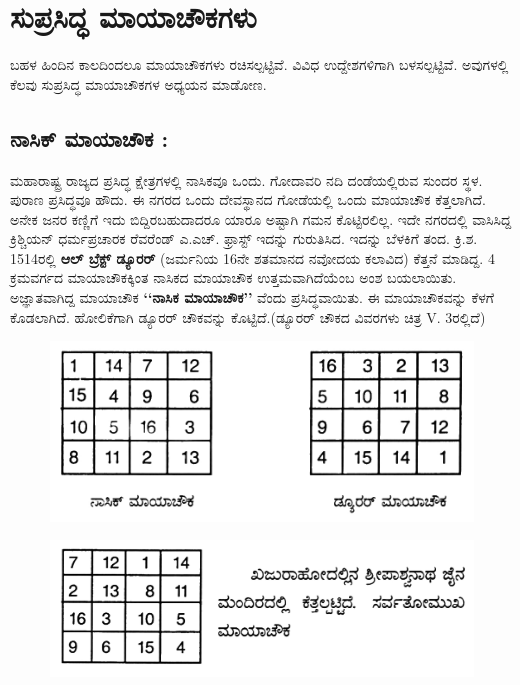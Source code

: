 \chapter{ಸುಪ್ರಸಿದ್ಧ ಮಾಯಾಚೌಕಗಳು}

ಬಹಳ ಹಿಂದಿನ ಕಾಲದಿಂದಲೂ ಮಾಯಾಚೌಕಗಳು ರಚಿಸಲ್ಪಟ್ಟಿವೆ. ವಿವಿಧ ಉದ್ದೇಶಗಳಿಗಾಗಿ ಬಳಸಲ್ಪಟ್ಟಿವೆ. ಅವುಗಳಲ್ಲಿ ಕೆಲವು ಸುಪ್ರಸಿದ್ಧ ಮಾಯಾಚೌಕಗಳ ಅಧ್ಯಯನ ಮಾಡೋಣ.

\section*{ನಾಸಿಕ್ ಮಾಯಾಚೌಕ :}

ಮಹಾರಾಷ್ಟ್ರ ರಾಜ್ಯದ ಪ್ರಸಿದ್ಧ ಕ್ಷೇತ್ರಗಳಲ್ಲಿ ನಾಸಿಕವೂ ಒಂದು. ಗೋದಾವರಿ ನದಿ ದಂಡೆ\-ಯಲ್ಲಿರುವ ಸುಂದರ ಸ್ಥಳ. ಪುರಾಣ ಪ್ರಸಿದ್ಧವೂ ಹೌದು. ಈ ನಗರದ ಒಂದು ದೇವಸ್ಥಾನದ ಗೋಡೆಯಲ್ಲಿ ಒಂದು ಮಾಯಾಚೌಕ ಕೆತ್ತಲಾಗಿದೆ. ಅನೇಕ ಜನರ ಕಣ್ಣಿಗೆ ಇದು ಬಿದ್ದಿರಬಹುದಾದರೂ ಯಾರೂ ಅಷ್ಟಾಗಿ ಗಮನ ಕೊಟ್ಟಿರಲಿಲ್ಲ. ಇದೇ ನಗರದಲ್ಲಿ ವಾಸಿಸಿದ್ದ ಕ್ರಿಶ್ಚಿಯನ್ ಧರ್ಮಪ್ರಚಾರಕ ರೆವರೆಂಡ್ ಎ.ಎಚ್. ಫ್ರಾಸ್ಟ್ ಇದನ್ನು ಗುರುತಿಸಿದ. ಇದನ್ನು ಬೆಳಕಿಗೆ ತಂದ. ಕ್ರಿ.ಶ. 1514ರಲ್ಲಿ \textbf{ಆಲ್ ಬ್ರೆಕ್ಟ್ ಡ್ಯೂರರ್} (ಜರ್ಮನಿಯ 16ನೇ ಶತಮಾನದ ನವೋದಯ ಕಲಾವಿದ) ಕೆತ್ತನೆ ಮಾಡಿದ್ದ. 4 ಕ್ರಮವರ್ಗದ ಮಾಯಾಚೌಕಕ್ಕಿಂತ ನಾಸಿಕದ ಮಾಯಾಚೌಕ ಉತ್ತಮವಾಗಿದೆಯೆಂಬ ಅಂಶ ಬಯಲಾಯಿತು. ಅಜ್ಞಾತವಾಗಿದ್ದ ಮಾಯಾಚೌಕ \textbf{‘‘ನಾಸಿಕ ಮಾಯಾಚೌಕ’’} ವೆಂದು ಪ್ರಸಿದ್ಧವಾಯಿತು. ಈ ಮಾಯಾಚೌಕವನ್ನು ಕೆಳಗೆ ಕೊಡಲಾಗಿದೆ. ಹೋಲಿಕೆಗಾಗಿ ಡ್ಯೂರರ್ ಚೌಕವನ್ನು ಕೊಟ್ಟಿದೆ.(ಡ್ಯೂರರ್ ಚೌಕದ ವಿವರಗಳು ಚಿತ್ರ V. 3\break ರಲ್ಲಿದೆ)
\begin{figure}[H]
\includegraphics[scale=.8]{src/figures/chap4/fig4.1.jpg}
\end{figure}
\begin{figure}[H]
\includegraphics[scale=.8]{src/figures/chap4/fig4.2.jpg}
\end{figure}

